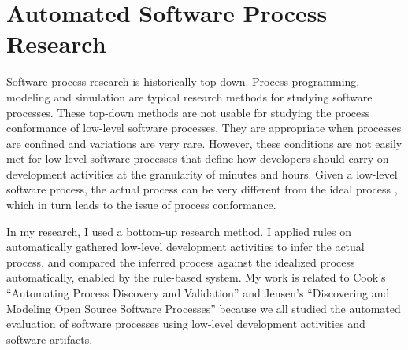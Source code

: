 \documentclass[smallextended]{svjour3}     %
\begin{document}

\section{Automated Software Process Research}
\label{sec:related-automation}
Software process research is historically top-down. Process
programming\cite{Sutton:95}, modeling\cite{Curtis:92} and 
simulation\cite{Turnu:04,Jensen:05} are typical research 
methods for studying software processes. These top-down
methods are not usable for studying the process conformance of 
low-level software processes. They are appropriate when 
processes are confined and variations are very rare. 
However, these conditions are not easily met for low-level
software processes that define how developers should carry
on development activities at the granularity of minutes
and hours. Given a low-level software process, the actual 
process can be very different from the ideal process 
\cite{csdl-98-04,csdl2-06-01,csdl2-01-12}, which in turn leads 
to the issue of process conformance. 

In my research, I used a bottom-up research method. I applied 
rules on automatically gathered low-level development activities 
to infer the actual process, and compared the inferred process 
against the idealized process automatically, enabled by the 
rule-based system. My work is related to Cook's ``Automating 
Process Discovery and Validation'' and Jensen's ``Discovering 
and Modeling Open Source Software Processes'' because we all 
studied the automated evaluation of software processes using 
low-level development activities and software artifacts. 

%
\end{document}

